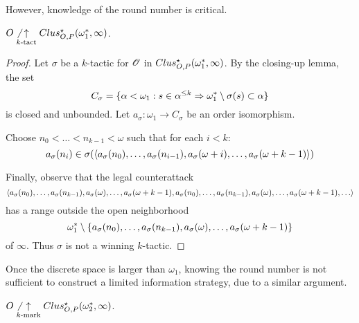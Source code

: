 However, knowledge of the round number is critical.

\begin{thm}
  $O\not\underset{k\text{-tact}}{\uparrow}Clus_{O,P}^\star(\omega^*_1,\infty)$.
\end{thm}

\begin{proof}
  Let $\sigma$ be a $k$-tactic for $\mathscr{O}$ in
  $Clus_{O,P}^\star(\omega^*_1,\infty)$. By the closing-up lemma, the set
    \[
      C_\sigma
        =
      \{
        \alpha<\omega_1
          :
        s\in\alpha^{\leq k}
          \Rightarrow
        \omega^*_1\setminus\sigma(s)
        \subset \alpha
      \}
    \]
  is closed and unbounded. Let $a_\sigma:\omega_1\to C_\sigma$ be an order
  isomorphism.

  Choose $n_0<\dots<n_{k-1}<\omega$ such that for each $i<k$:
    \[
      a_\sigma(n_i)
        \in
      \sigma(
        \langle a_\sigma(n_0),\dots,a_\sigma(n_{i-1}),
          a_\sigma(\omega+i),\dots,a_\sigma(\omega+k-1)\rangle
      )
    \]

  Finally, observe that the legal counterattack
    \[
      \<a_\sigma(n_0),\dots,a_\sigma(n_{k-1}),
        a_\sigma(\omega),\dots,a_\sigma(\omega+k-1),
        a_\sigma(n_0),\dots,a_\sigma(n_{k-1}),
        a_\sigma(\omega),\dots,a_\sigma(\omega+k-1),
        \dots\>
    \]
  has a range outside the open neighborhood %
    \[
      \omega^*_1
        \setminus
      \{a_\sigma(n_0),\dots,a_\sigma(n_{k-1}),
        a_\sigma(\omega),\dots,a_\sigma(\omega+k-1)\}
    \]
  of $\infty$. Thus $\sigma$ is not a winning $k$-tactic.
\end{proof}

Once the discrete space is larger than $\omega_1$, knowing the round number
is not sufficient to construct a limited information strategy, due to a
similar argument.

\begin{thm}
  $O\not\underset{k\text{-mark}}{\uparrow}Clus_{O,P}^\star(\omega^*_2,\infty)$.
\end{thm}

